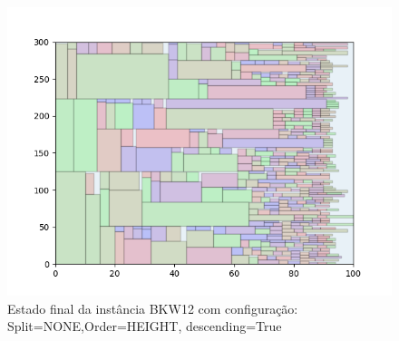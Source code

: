 \begin{figure}[H]
    \centering
    \caption[]{Estado final da instância BKW12 com configuração: Split=NONE,Order=HEIGHT, descending=True}
    \label{fig:bkw12-none-height-true}
    \includegraphics[scale=0.5]{output/figures/bkw/bkw12/none/height/true/000}
\end{figure}